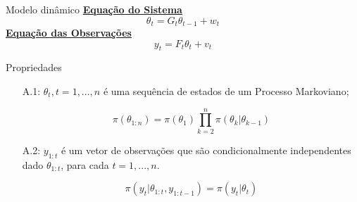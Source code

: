\documentclass{beamer}
\begin{document}
\begin{frame}{Modelo dinâmico}
\pause
\underline{\textbf{Equação do Sistema}}
$$
\theta_t =  G_t \theta_{t-1} + w_t
$$
\pause
\underline{\textbf{Equação das Observações}}
$$
y_t  =  F_t \theta_{t} + v_t
$$

\end{frame}

\begin{frame}{Propriedades}
\begin{center}
\begin{itemize}
\item[A.1:] $\theta_t, t=1,...,n$ é uma sequência de estados de um Processo Markoviano;

$$
\pi(\theta_{1:n}) = \pi(\theta_1) \prod_{k=2}^n \pi(\theta_k|\theta_{k-1}) 
$$

\pause 

\item[A.2:] $y_{1:t}$ é um vetor de observações que são condicionalmente independentes dado $\theta_{1:t}$, para cada $t=1,...,n$.

$$
\pi(y_t|\theta_{1:t},y_{1:t-1}) = \pi(y_t|\theta_{t})
$$

\end{itemize}
\end{center}
\end{frame}
\end{document}
